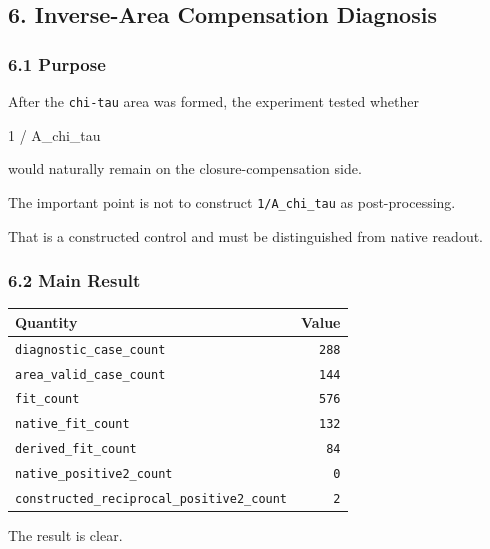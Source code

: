 \documentclass[
]{article}
\newenvironment{Shaded}{}{}
\newcommand{\NormalTok}[1]{#1}
\newcounter{none} %
\begin{document}
\subsection{6. Inverse-Area Compensation
Diagnosis}\label{inverse-area-compensation-diagnosis}

\subsubsection{6.1 Purpose}\label{purpose}

After the \texttt{chi-tau} area was formed, the experiment tested
whether

\begin{Shaded}
\begin{Highlighting}[]
\NormalTok{1 / A\_chi\_tau}
\end{Highlighting}
\end{Shaded}

would naturally remain on the closure-compensation side.

The important point is not to construct \texttt{1/A\_chi\_tau} as
post-processing.

That is a constructed control and must be distinguished from native
readout.

\subsubsection{6.2 Main Result}\label{main-result-4}

{\def\LTcaptype{none} %
\begin{longtable}[]{@{}lr@{}}
\toprule\noalign{}
Quantity & Value \\
\midrule\noalign{}
\endhead
\bottomrule\noalign{}
\endlastfoot
\texttt{diagnostic\_case\_count} & \texttt{288} \\
\texttt{area\_valid\_case\_count} & \texttt{144} \\
\texttt{fit\_count} & \texttt{576} \\
\texttt{native\_fit\_count} & \texttt{132} \\
\texttt{derived\_fit\_count} & \texttt{84} \\
\texttt{native\_positive2\_count} & \texttt{0} \\
\texttt{constructed\_reciprocal\_positive2\_count} & \texttt{2} \\
\end{longtable}
}

The result is clear.
\end{document}
